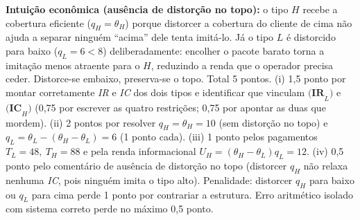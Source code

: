\begin{solucao}
\textbf{Intui\c{c}\~ao econ\^omica (aus\^encia de distor\c{c}\~ao no topo):} o tipo $H$ recebe a cobertura eficiente ($q_H = \theta_H$) porque distorcer a cobertura do cliente de cima n\~ao ajuda a separar \textemdash{} ningu\'em ``acima'' dele tenta imit\'a-lo. J\'a o tipo $L$ \'e distorcido para baixo ($q_L = 6 < 8$) deliberadamente: encolher o pacote barato torna a imita\c{c}\~ao menos atraente para o $H$, reduzindo a renda que o operador precisa ceder. Distorce-se embaixo, preserva-se o topo.
\rubricalabel
Total 5 pontos. (i) 1{,}5 ponto por montar corretamente \emph{IR} e \emph{IC} dos dois tipos e identificar que vinculam $\textbf{(IR}_L\textbf{)}$ e $\textbf{(IC}_H\textbf{)}$ (0{,}75 por escrever as quatro restri\c{c}\~oes; 0{,}75 por apontar as duas que mordem). (ii) 2 pontos por resolver $q_H = \theta_H = 10$ (sem distor\c{c}\~ao no topo) e $q_L = \theta_L - (\theta_H - \theta_L) = 6$ (1 ponto cada). (iii) 1 ponto pelos pagamentos $T_L = 48,\ T_H = 88$ e pela renda informacional $U_H = (\theta_H-\theta_L)q_L = 12$. (iv) 0{,}5 ponto pelo coment\'ario de aus\^encia de distor\c{c}\~ao no topo (distorcer $q_H$ n\~ao relaxa nenhuma \emph{IC}, pois ningu\'em imita o tipo alto). Penalidade: distorcer $q_H$ para baixo ou $q_L$ para cima perde 1 ponto por contrariar a estrutura. Erro aritm\'etico isolado com sistema correto perde no m\'aximo 0{,}5 ponto.
\end{solucao}

